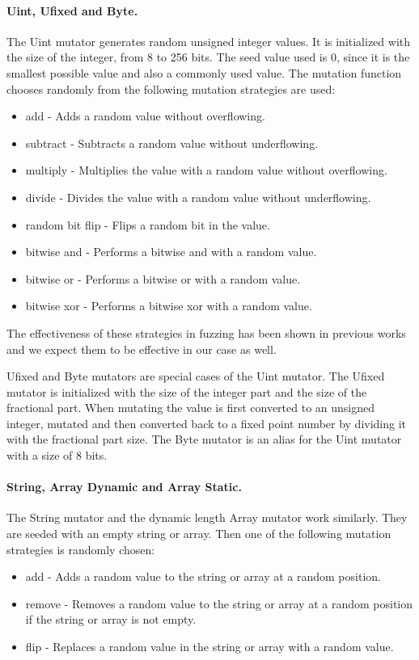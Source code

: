 \paragraph{Uint, Ufixed and Byte.}
The Uint mutator generates random unsigned integer values. It is initialized with the size of the integer, from 8 to 256 bits. The seed value used is 0, since it is the smallest possible value and also a commonly used value. The mutation function chooses randomly from the following mutation strategies are used:
\begin{itemize}
    \item add - Adds a random value without overflowing.
    \item subtract - Subtracts a random value without underflowing.
    \item multiply - Multiplies the value with a random value without overflowing.
    \item divide - Divides the value with a random value without underflowing.
    \item random bit flip - Flips a random bit in the value.
    \item bitwise and - Performs a bitwise and with a random value.
    \item bitwise or - Performs a bitwise or with a random value.
    \item bitwise xor - Performs a bitwise xor with a random value.
\end{itemize}
The effectiveness of these strategies in fuzzing has been shown in previous works and we expect them to be effective in our case as well.

Ufixed and Byte mutators are special cases of the Uint mutator. The Ufixed mutator is initialized with the size of the integer part and the size of the fractional part. When mutating the value is first converted to an unsigned integer, mutated and then converted back to a fixed point number by dividing it with the fractional part size. The Byte mutator is an alias for the Uint mutator with a size of 8 bits.

\paragraph{String, Array Dynamic and Array Static.}
The String mutator and the dynamic length Array mutator work similarly. They are seeded with an empty string or array. Then one of the following mutation strategies is randomly chosen:
\begin{itemize}
    \item add - Adds a random value to the string or array at a random position.
    \item remove - Removes a random value to the string or array at a random position if the string or array is not empty.
    \item flip - Replaces a random value in the string or array with a random value.
\end{itemize}

